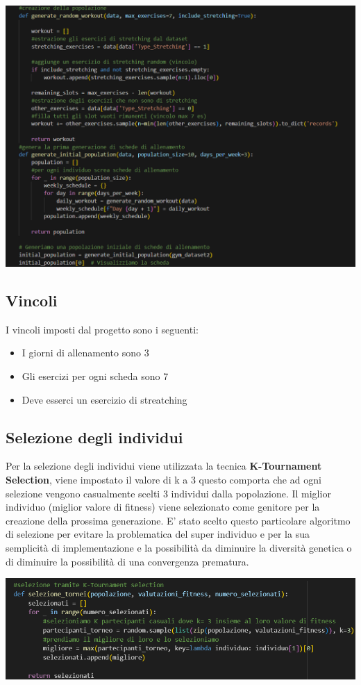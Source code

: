 \documentclass{book}
\begin{document}
\includegraphics[width=1.0\linewidth]{CreazionePopolazione.png}
\subsection{Vincoli}
I vincoli imposti dal progetto sono i seguenti:
\begin{itemize}
    \item I giorni di allenamento sono 3
    \item Gli esercizi per ogni scheda sono 7
    \item Deve esserci un esercizio di streatching
\end{itemize}

 \subsection{Selezione degli individui}
  Per la selezione degli individui viene utilizzata la tecnica \textbf{K-Tournament Selection}, viene impostato il valore di k a 3 questo comporta che ad ogni selezione vengono casualmente scelti 3 individui dalla popolazione. Il miglior individuo (miglior valore di fitness) viene selezionato come genitore per la creazione della prossima generazione. E' stato scelto questo particolare algoritmo di selezione per evitare la problematica del super individuo e per la sua semplicità di implementazione e la possibilità da diminuire la diversità genetica o di diminuire la possibilità di una convergenza prematura.\newline

\includegraphics[width=1.0\linewidth]{Selection.png} 
\end{document}
